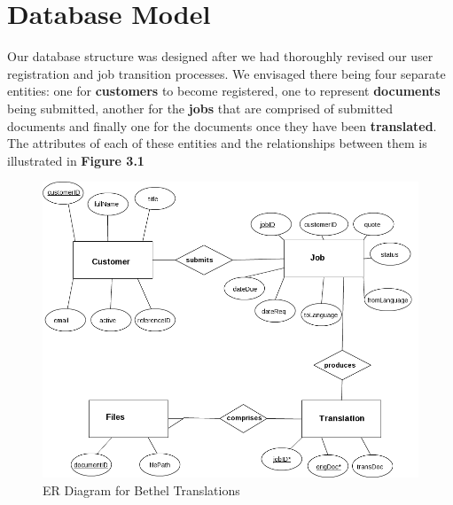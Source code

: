 \documentclass{l3proj}
\begin{document}




\section{Database Model}

Our database structure was designed after we had thoroughly revised our user registration and job transition processes. We envisaged there being four separate entities: one for \textbf{customers} to become registered, one to represent \textbf{documents} being submitted, another for the \textbf{jobs} that are comprised of submitted documents and finally one for the documents once they have been \textbf{translated}. The attributes of each of these entities and the relationships between them is illustrated in \textbf{Figure 3.1} 

\begin{figure}
\begin{center}
\includegraphics[width=\linewidth]{bt-dbstruct}
\caption{ER Diagram for Bethel Translations}
\end{center}
\end{figure}
\end{document}
